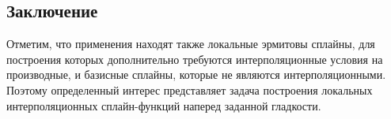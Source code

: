 \subsection{ Заключение}
Отметим, что применения находят также локальные эрмитовы сплайны,
для построения которых
дополнительно требуются интерполяционные условия на производные,
и базисные сплайны, которые не являются интерполяционными.
Поэтому определенный интерес представляет задача построения локальных
интерполяционных сплайн-функций наперед заданной гладкости.




































